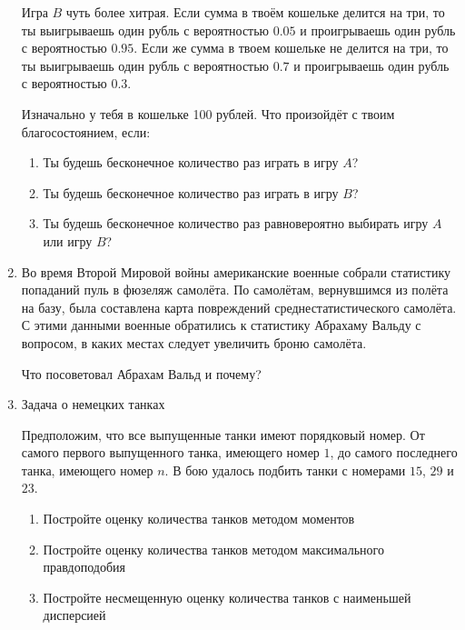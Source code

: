 \documentclass[nobib]{tufte-handout}
\begin{document}
\begin{enumerate}
Игра $B$ чуть более хитрая. Если сумма в твоём кошельке делится на три, то ты выигрываешь один рубль с вероятностью $0.05$ и проигрываешь один рубль с вероятностью $0.95$. Если же
сумма в твоем кошельке не делится на три, то ты выигрываешь один рубль с вероятностью $0.7$ и проигрываешь один рубль с вероятностью $0.3$.

Изначально у тебя в кошельке 100 рублей. Что произойдёт с твоим благосостоянием, если:

\begin{enumerate}
\item Ты будешь бесконечное количество раз играть в игру $A$?
\item Ты будешь бесконечное количество раз играть в игру $B$?
\item Ты будешь бесконечное количество раз равновероятно выбирать игру $A$ или игру $B$?
\end{enumerate}



\item Во время Второй Мировой войны американские военные собрали статистику попаданий пуль в фюзеляж самолёта.  По самолётам, вернувшимся из полёта на базу, была составлена карта повреждений среднестатистического самолёта. С этими данными военные обратились к статистику Абрахаму Вальду с вопросом, в каких местах следует увеличить броню самолёта.

Что посоветовал Абрахам Вальд и почему?

\item Задача о немецких танках

Предположим, что все выпущенные танки имеют порядковый номер. От самого первого выпущенного танка, имеющего номер $1$, до самого последнего танка, имеющего номер $n$. В бою удалось подбить танки с номерами $15$, $29$ и $23$. 

\begin{enumerate}
\item Постройте оценку количества танков методом моментов 
\item Постройте оценку количества танков методом максимального правдоподобия
\item Постройте несмещенную оценку количества танков с наименьшей дисперсией
\end{enumerate} 


\end{enumerate}
\end{document}
